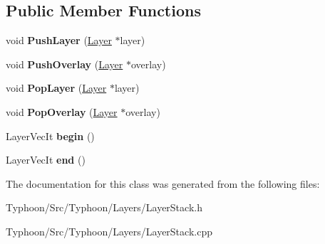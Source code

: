\subsection*{Public Member Functions}
\begin{DoxyCompactItemize}
\item 
\mbox{\label{class_typhoon_engine_1_1_layer_stack_a57f9cee14cf971a534e6c6c7047d97b6}} 
void {\bfseries Push\+Layer} (\mbox{\hyperlink{class_typhoon_engine_1_1_layer}{Layer}} $\ast$layer)
\item 
\mbox{\label{class_typhoon_engine_1_1_layer_stack_a6e7aadbe58e63c88c09c86ae2d8a397a}} 
void {\bfseries Push\+Overlay} (\mbox{\hyperlink{class_typhoon_engine_1_1_layer}{Layer}} $\ast$overlay)
\item 
\mbox{\label{class_typhoon_engine_1_1_layer_stack_a308b6a991e2328846f4ddc05dcda293f}} 
void {\bfseries Pop\+Layer} (\mbox{\hyperlink{class_typhoon_engine_1_1_layer}{Layer}} $\ast$layer)
\item 
\mbox{\label{class_typhoon_engine_1_1_layer_stack_a0486b7bf10eaa0fb07e65e90d2bd4cc3}} 
void {\bfseries Pop\+Overlay} (\mbox{\hyperlink{class_typhoon_engine_1_1_layer}{Layer}} $\ast$overlay)
\item 
\mbox{\label{class_typhoon_engine_1_1_layer_stack_a6caff27c3f24b2f305d2905350ff98ab}} 
Layer\+Vec\+It {\bfseries begin} ()
\item 
\mbox{\label{class_typhoon_engine_1_1_layer_stack_ab62c383c4ea8ba022f9a764edb65b851}} 
Layer\+Vec\+It {\bfseries end} ()
\end{DoxyCompactItemize}


The documentation for this class was generated from the following files\+:\begin{DoxyCompactItemize}
\item 
Typhoon/\+Src/\+Typhoon/\+Layers/Layer\+Stack.\+h\item 
Typhoon/\+Src/\+Typhoon/\+Layers/Layer\+Stack.\+cpp\end{DoxyCompactItemize}
